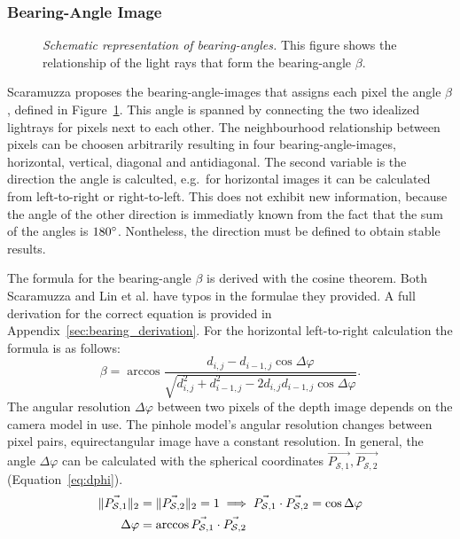 \subsubsection{Bearing-Angle Image}

\begin{figure}[b!]
    \centering
    \scalebox{0.9}{%
    }
    \caption[Schematic representation of \glspl{bearing-angle}]{\emph{Schematic representation of \glspl{bearing-angle}.} This figure shows the relationship of the light rays that form the \gls{bearing-angle} $\beta$.}\label{fig:bearing_angle}
\end{figure}
Scaramuzza\cite{scaramuzza_iros2007} proposes the \Glspl{bearing-angle-image} that assigns each pixel the angle $\beta$, defined in Figure~\ref{fig:bearing_angle}.
This angle is spanned by connecting the two idealized lightrays for pixels next to each other.
The neighbourhood relationship between pixels can be choosen arbitrarily resulting in four \Glspl{bearing-angle-image}, horizontal, vertical, diagonal and antidiagonal.
The second variable is the direction the angle is calculted, e.g.~for horizontal images it can be calculated from left-to-right or right-to-left.
This does not exhibit new information, because the angle of the other direction is immediatly known from the fact that the sum of the angles is $180\degree$.
Nontheless, the direction must be defined to obtain stable results.

The formula for the \gls{bearing-angle} $\beta$ is derived with the cosine theorem.
Both Scaramuzza\cite{scaramuzza_iros2007} and Lin et al.\cite{lin_easp2017} have typos in the formulae they provided.
A full derivation for the correct equation is provided in Appendix~\ref{sec:bearing_derivation}.
For the horizontal left-to-right calculation the formula is as follows:
\begin{equation}\label{eq:bearing-angle}
    \beta = \arccos%
            \frac{d_{i,j} - d_{i-1,j} \cos \Delta\varphi}%
                {\sqrt{d_{i,j}^2 + d_{i-1,j}^2 - 2 d_{i,j} d_{i-1,j} \cos \Delta\varphi}}\text{.}
\end{equation}
The angular resolution $\Delta\varphi$ between two pixels of the depth image depends on the camera model in use.
The pinhole model's angular resolution changes between pixel pairs, equirectangular image have a constant resolution.
In general, the angle $\Delta\varphi$ can be calculated with the spherical coordinates $\vec{P_{\mathcal{S},1}}, \vec{P_{\mathcal{S},2}}$ (Equation~\ref{eq:dphi}).
\pagebreak
\begin{equation}
\begin{aligned}
    \lVert\vec{P_{\mathcal{S},1}}\rVert_{2} &= \lVert\vec{P_{\mathcal{S},2}}\rVert_{2} = 1 \implies \vec{P_{\mathcal{S},1}} \cdot \vec{P_{\mathcal{S},2}} = \cos \Delta\varphi \\
    \Delta\varphi &= \arccos \vec{P_{\mathcal{S},1}} \cdot \vec{P_{\mathcal{S},2}}
    \label{eq:dphi}
\end{aligned}
\end{equation}

